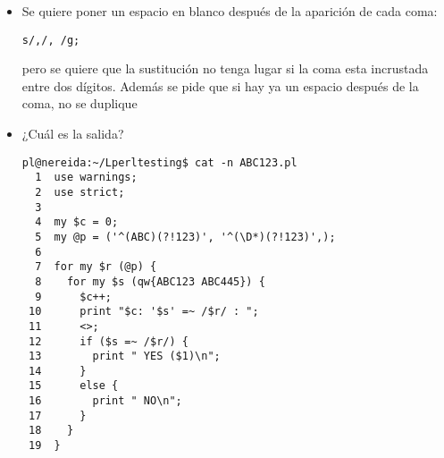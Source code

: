 \begin{exercise}
\begin{itemize}
\item
Se quiere poner un espacio en blanco después de la aparición de cada coma:
\begin{verbatim}
s/,/, /g;
\end{verbatim}
pero se quiere que la sustitución no tenga lugar si la coma esta incrustada entre
dos dígitos. Además se pide que si hay ya un espacio después de la coma,
no se duplique






\item
¿Cuál es la salida?
\begin{latexonly}
\begin{verbatim}
pl@nereida:~/Lperltesting$ cat -n ABC123.pl
  1  use warnings;
  2  use strict;
  3
  4  my $c = 0;
  5  my @p = ('^(ABC)(?!123)', '^(\D*)(?!123)',);
  6
  7  for my $r (@p) {
  8    for my $s (qw{ABC123 ABC445}) {
  9      $c++;
 10      print "$c: '$s' =~ /$r/ : ";
 11      <>;
 12      if ($s =~ /$r/) {
 13        print " YES ($1)\n";
 14      }
 15      else {
 16        print " NO\n";
 17      }
 18    }
 19  }
\end{verbatim}
\end{latexonly}
\begin{rawhtml}


\end{rawhtml}
\end{itemize}
\end{exercise}
